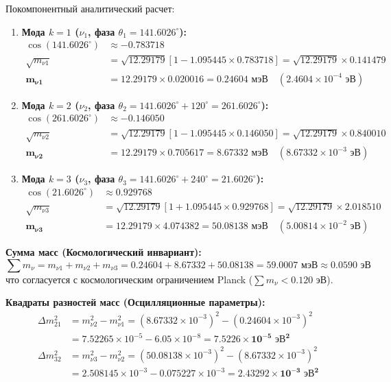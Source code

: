 \documentclass[12pt,a4paper]{article}
\begin{document}
	Покомпонентный аналитический расчет:
	\begin{enumerate}
		\item \textbf{Мода $k=1$ ($\nu_1$, фаза $\theta_1 = 141.6026^\circ$):}
		\begin{align}
			\cos(141.6026^\circ) &\approx -0.783718 \\
			\sqrt{m_{\nu 1}} &= \sqrt{12.29179} \left[ 1 - 1.095445 \times 0.783718 \right] = \sqrt{12.29179} \times 0.141479 \\
			\mathbf{m_{\nu 1}} &= 12.29179 \times 0.020016 = \mathbf{0.24604 \text{ мэВ}} \quad (2.4604 \times 10^{-4} \text{ эВ})
		\end{align}
		\item \textbf{Мода $k=2$ ($\nu_2$, фаза $\theta_2 = 141.6026^\circ + 120^\circ = 261.6026^\circ$):}
		\begin{align}
			\cos(261.6026^\circ) &\approx -0.146050 \\
			\sqrt{m_{\nu 2}} &= \sqrt{12.29179} \left[ 1 - 1.095445 \times 0.146050 \right] = \sqrt{12.29179} \times 0.840010 \\
			\mathbf{m_{\nu 2}} &= 12.29179 \times 0.705617 = \mathbf{8.67332 \text{ мэВ}} \quad (8.67332 \times 10^{-3} \text{ эВ})
		\end{align}
		\item \textbf{Мода $k=3$ ($\nu_3$, фаза $\theta_3 = 141.6026^\circ + 240^\circ = 21.6026^\circ$):}
		\begin{align}
			\cos(21.6026^\circ) &\approx 0.929768 \\
			\sqrt{m_{\nu 3}} &= \sqrt{12.29179} \left[ 1 + 1.095445 \times 0.929768 \right] = \sqrt{12.29179} \times 2.018510 \\
			\mathbf{m_{\nu 3}} &= 12.29179 \times 4.074382 = \mathbf{50.08138 \text{ мэВ}} \quad (5.00814 \times 10^{-2} \text{ эВ})
		\end{align}
	\end{enumerate}
	
	\textbf{Сумма масс (Космологический инвариант):}
	\begin{equation}
		\sum m_\nu = m_{\nu 1} + m_{\nu 2} + m_{\nu 3} = 0.24604 + 8.67332 + 50.08138 = \mathbf{59.0007 \text{ мэВ}} \approx \mathbf{0.0590 \text{ эВ}}
	\end{equation}
	что согласуется с космологическим ограничением Planck ($\sum m_\nu < 0.120$ эВ).
	
	\textbf{Квадраты разностей масс (Осцилляционные параметры):}
	\begin{align}
		\Delta m_{21}^2 &= m_{\nu 2}^2 - m_{\nu 1}^2 = (8.67332 \times 10^{-3})^2 - (0.24604 \times 10^{-3})^2 \nonumber \\
		&= 7.52265 \times 10^{-5} - 6.05 \times 10^{-8} = \mathbf{7.5226 \times 10^{-5} \text{ эВ}^2} \\
		\Delta m_{32}^2 &= m_{\nu 3}^2 - m_{\nu 2}^2 = (50.08138 \times 10^{-3})^2 - (8.67332 \times 10^{-3})^2 \nonumber \\
		&= 2.508145 \times 10^{-3} - 0.075227 \times 10^{-3} = \mathbf{2.43292 \times 10^{-3} \text{ эВ}^2}
	\end{align}
	
\end{document}
